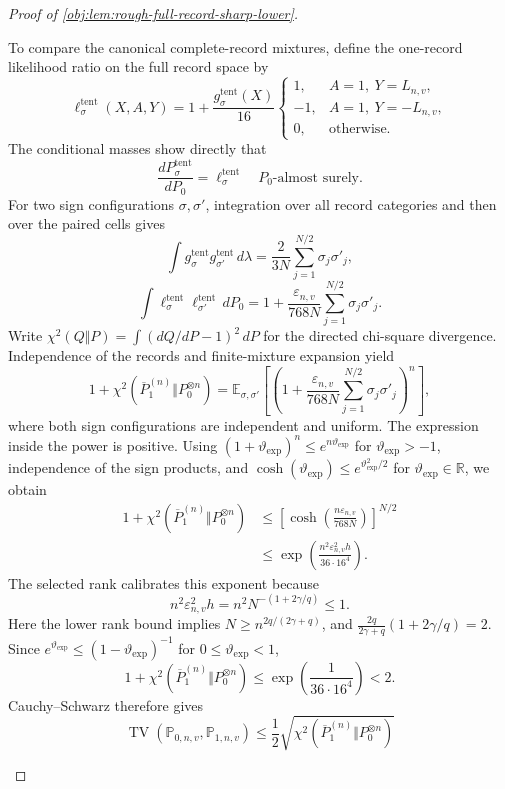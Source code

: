 \begin{proof}[Proof of \cref{obj:lem:rough-full-record-sharp-lower}]
\begin{enumerate}
To compare the canonical complete-record mixtures, define the one-record likelihood ratio on the full record space by
\[
\ell^{\mathrm{tent}}_\sigma(X,A,Y)
=1+\frac{g^{\mathrm{tent}}_\sigma(X)}{16}
\begin{cases}
1,&A=1,\ Y=L_{n,v},\\
-1,&A=1,\ Y=-L_{n,v},\\
0,&\text{otherwise}.
\end{cases}
\]
The conditional masses show directly that
\[
\frac{dP^{\mathrm{tent}}_\sigma}{dP_0}
=\ell^{\mathrm{tent}}_\sigma
\quad P_0\text{-almost surely}.
\]
For two sign configurations \(\sigma,\sigma'\), integration over all record categories and then over the paired cells gives
\[
\int g^{\mathrm{tent}}_\sigma
 g^{\mathrm{tent}}_{\sigma'}\,d\lambda
=\frac{2}{3N}\sum_{j=1}^{N/2}\sigma_j\sigma'_j,
\]
\[
\int\ell^{\mathrm{tent}}_\sigma
\ell^{\mathrm{tent}}_{\sigma'}\,dP_0
=1+\frac{\varepsilon_{n,v}}{768N}
\sum_{j=1}^{N/2}\sigma_j\sigma'_j.
\]
Write \(\chi^2(Q\Vert P)=\int(dQ/dP-1)^2\,dP\) for the directed chi-square divergence. Independence of the records and finite-mixture expansion yield
\[
1+\chi^2(\overline P_1^{(n)}\Vert P_0^{\otimes n})
=\mathbb E_{\sigma,\sigma'}
\left[
\left(1+\frac{\varepsilon_{n,v}}{768N}
\sum_{j=1}^{N/2}\sigma_j\sigma'_j\right)^n
\right],
\]
where both sign configurations are independent and uniform.
The expression inside the power is positive. Using
\((1+\vartheta_{\mathrm{exp}})^n\le e^{n\vartheta_{\mathrm{exp}}}\) for \(\vartheta_{\mathrm{exp}}>-1\), independence of the sign products, and
\(\cosh(\vartheta_{\mathrm{exp}})\le e^{\vartheta_{\mathrm{exp}}^2/2}\) for \(\vartheta_{\mathrm{exp}}\in\mathbb R\), we obtain
\[
\begin{aligned}
1+\chi^2(\overline P_1^{(n)}\Vert P_0^{\otimes n})
&\le
\left[\cosh\!\left(\frac{n\varepsilon_{n,v}}{768N}\right)\right]^{N/2}\\
&\le
\exp\!\left(\frac{n^2\varepsilon_{n,v}^2h}{36\cdot16^4}\right).
\end{aligned}
\]
The selected rank calibrates this exponent because
\[
n^2\varepsilon_{n,v}^2h
=n^2N^{-(1+2\gamma/q)}\le1.
\]
Here the lower rank bound implies
\(N\ge n^{2q/(2\gamma+q)}\), and
\(\frac{2q}{2\gamma+q}(1+2\gamma/q)=2\).
Since \(e^{\vartheta_{\mathrm{exp}}}\le(1-\vartheta_{\mathrm{exp}})^{-1}\) for \(0\le\vartheta_{\mathrm{exp}}<1\),
\[
1+\chi^2(\overline P_1^{(n)}\Vert P_0^{\otimes n})
\le\exp\!\left(\frac1{36\cdot16^4}\right)<2.
\]
Cauchy--Schwarz therefore gives
\[
\operatorname{TV}(\mathbb P_{0,n,v},\mathbb P_{1,n,v})
\le\frac12
\sqrt{\chi^2(\overline P_1^{(n)}\Vert P_0^{\otimes n})}
\]
\end{enumerate}
\end{proof}
